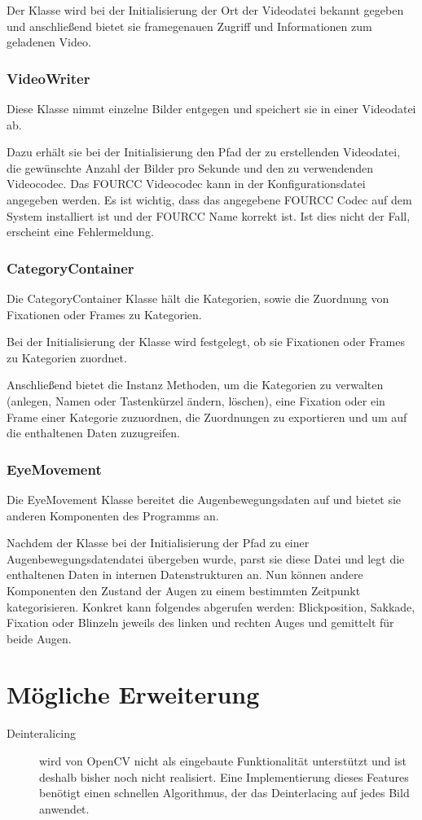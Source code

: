 \documentclass[a4paper,draft]{scrartcl}
\begin{document}
Der Klasse wird bei der Initialisierung der Ort der Videodatei bekannt gegeben und anschließend bietet sie framegenauen Zugriff und Informationen zum geladenen Video.

\subsubsection{VideoWriter}
Diese Klasse nimmt einzelne Bilder entgegen und speichert sie in einer Videodatei ab.

Dazu erhält sie bei der Initialisierung den Pfad der zu erstellenden Videodatei, die gewünschte Anzahl der Bilder pro Sekunde und den zu verwendenden Videocodec.
Das FOURCC Videocodec kann in der Konfigurationsdatei angegeben werden. Es ist wichtig, dass das angegebene FOURCC Codec auf dem System installiert ist und der FOURCC Name korrekt ist. Ist dies nicht der Fall, erscheint eine Fehlermeldung.

\subsubsection{CategoryContainer}
Die CategoryContainer Klasse hält die Kategorien, sowie die Zuordnung von Fixationen oder Frames zu Kategorien.

Bei der Initialisierung der Klasse wird festgelegt, ob sie Fixationen oder Frames zu Kategorien zuordnet.

Anschließend bietet die Instanz Methoden, um die Kategorien zu verwalten (anlegen, Namen oder Tastenkürzel ändern, löschen), eine Fixation oder ein Frame einer Kategorie zuzuordnen, die Zuordnungen zu exportieren und um auf die enthaltenen Daten zuzugreifen.

\subsubsection{EyeMovement}
Die EyeMovement Klasse bereitet die Augenbewegungsdaten auf und bietet sie anderen Komponenten des Programms an.

Nachdem der Klasse bei der Initialisierung der Pfad zu einer Augenbewegungsdatendatei übergeben wurde, parst sie diese Datei und legt die enthaltenen Daten in internen Datenstrukturen an. Nun können andere Komponenten den Zustand der Augen zu einem bestimmten Zeitpunkt kategorisieren. Konkret kann folgendes abgerufen werden: Blickposition, Sakkade, Fixation oder Blinzeln jeweils des linken und rechten Auges und gemittelt für beide Augen.

\section{M\"ogliche Erweiterung}
  \begin{description}
    \item[Deinteralicing] wird von OpenCV nicht als eingebaute Funktionalität unterstützt und ist deshalb bisher noch nicht realisiert. Eine Implementierung dieses Features benötigt einen schnellen Algorithmus, der das Deinterlacing auf jedes Bild anwendet. 
  \end{description}
\end{document}
